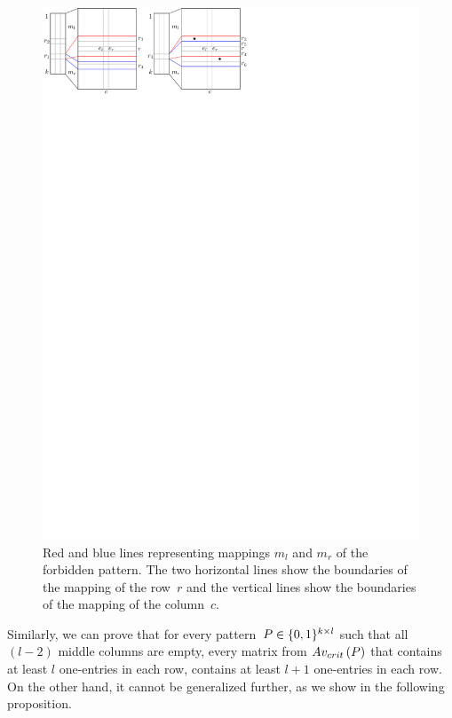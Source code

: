 \begin{figure}[!ht]
\centering
\includegraphics[width=130mm]{img/emptymidcol.pdf}
\caption{Red and blue lines representing mappings $m_l$ and $m_r$ of the forbidden pattern. The two horizontal lines show the boundaries of the mapping of the row~$r$ and the vertical lines show the boundaries of the mapping of the column~$c$.}
\label{fig:emptymid}
\end{figure}

Similarly, we can prove that for every pattern~$P\in\{0,1\}^{k\times l}$ such that all $(l-2)$ middle columns are empty, every matrix from $Av_{crit}\left(P\right)$ that contains at least $l$ one-entries in each row, contains at least $l+1$ one-entries in each row. On the other hand, it cannot be generalized further, as we show in the following proposition.

